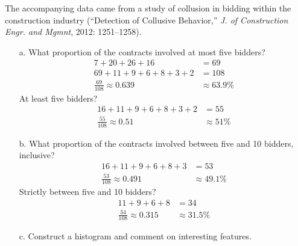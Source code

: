 \documentclass[letterpaper,12pt]{article}
\begin{document}
\begin{enumerate}
    The accompanying data came from a study of collusion in bidding within the construction industry (``Detection of Collusive Behavior,'' \textit{J. of Construction Engr. and Mgmnt}, 2012: 1251–1258).
    \begin{center}
      \pgfplotstabletypeset[
        assign column name/.style={/pgfplots/table/column name={\textbf{#1}}},
        every column/.append style={
          column type={S[]},
          string type,
        },
        row predicate/.code={
          \pgfmathtruncatemacro\maxrowindex{\pgfplotstablerows-1}
          \ifnum#1=\maxrowindex\relax
            \pgfplotstableuserowfalse
          \fi
        }
      ]{\datacontracts}
    \end{center}
    \begin{enumerate}
      \item[a.]
        What proportion of the contracts involved at most five bidders?
        \begin{align*}
          7 + 20 + 26 + 16 &= 69 \\
          69 + 11 + 9 + 6 + 8 + 3 + 2 &= 108 \\
          \frac{69}{108} \approx 0.639 &\approx 63.9\%
        \end{align*}
        At least five bidders?
        \begin{align*}
          16 + 11 + 9 + 6 + 8 + 3 + 2 &= 55 \\
          \frac{55}{108} \approx 0.51 &\approx 51\%
        \end{align*}
      \item[b.]
        What proportion of the contracts involved between five and 10 bidders, inclusive?
        \begin{align*}
          16 + 11 + 9 + 6 + 8 + 3 &= 53 \\
          \frac{53}{108} \approx 0.491 &\approx 49.1\%
        \end{align*}
        Strictly between five and 10 bidders?
        \begin{align*}
           11 + 9 + 6 + 8 &= 34 \\
          \frac{34}{108} \approx 0.315 &\approx 31.5\%
        \end{align*}
      \item[c.]
        Construct a histogram and comment on interesting features.

\end{enumerate}
\end{enumerate}
\end{document}
